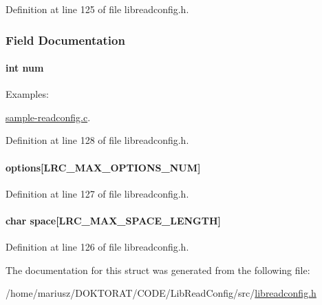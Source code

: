 Definition at line 125 of file libreadconfig.h.

\subsubsection{Field Documentation}
\hypertarget{struct_l_r_c__config_namespace_86cf672daa4e0ad11ad10efc894d19c8}{
\paragraph[{num}]{\setlength{\rightskip}{0pt plus 5cm}int {\bf num}}\hfill}
\label{struct_l_r_c__config_namespace_86cf672daa4e0ad11ad10efc894d19c8}


\begin{Desc}
\item[Examples: ]\par
\hyperlink{sample-readconfig_8c-example}{sample-readconfig.c}.\end{Desc}


Definition at line 128 of file libreadconfig.h.\hypertarget{struct_l_r_c__config_namespace_16c789b044489f42de63f78f84b539ba}{
\paragraph[{options}]{ {\bf options}\mbox{[}LRC\_\-MAX\_\-OPTIONS\_\-NUM\mbox{]}}\hfill}
\label{struct_l_r_c__config_namespace_16c789b044489f42de63f78f84b539ba}




Definition at line 127 of file libreadconfig.h.\hypertarget{struct_l_r_c__config_namespace_4754d9e0429a1914e3617de872b4a736}{
\paragraph[{space}]{\setlength{\rightskip}{0pt plus 5cm}char {\bf space}\mbox{[}LRC\_\-MAX\_\-SPACE\_\-LENGTH\mbox{]}}\hfill}
\label{struct_l_r_c__config_namespace_4754d9e0429a1914e3617de872b4a736}




Definition at line 126 of file libreadconfig.h.

The documentation for this struct was generated from the following file:\begin{CompactItemize}
\item 
/home/mariusz/DOKTORAT/CODE/LibReadConfig/src/\hyperlink{libreadconfig_8h}{libreadconfig.h}\end{CompactItemize}
